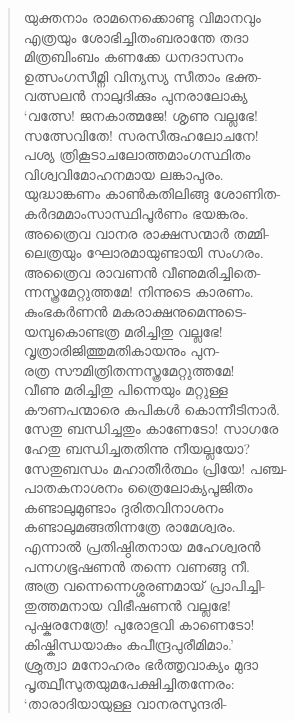 \begin{verse}
യുക്തനാം രാമനെക്കൊണ്ടു വിമാനവും\\
എത്രയും ശോഭിച്ചിതംബരാന്തേ തദാ\\
മിത്രബിംബം കണക്കേ ധനദാസനം\\
ഉത്സംഗസീമ്നി വിന്യസ്യ സീതാം ഭക്ത-\\
വത്സലന്‍ നാലുദിക്കും പുനരാലോക്യ\\
‘വത്സേ! ജനകാത്മജേ! ശൃണു വല്ലഭേ!\\
സത്സേവിതേ! സരസീരുഹലോചനേ!\\
പശ്യ ത്രികൂടാചലോത്തമാംഗസ്ഥിതം\\
വിശ്വവിമോഹനമായ ലങ്കാപുരം.\\
യുദ്ധാങ്കണം കാണ്‍കതിലിങ്ങു ശോണിത-\\
കര്‍ദമമാംസാസ്ഥിപൂര്‍ണം ഭയങ്കരം.\\
അത്രൈവ വാനര രാക്ഷസന്മാര്‍ തമ്മി-\\
ലെത്രയും ഘോരമായുണ്ടായി സംഗരം.\\
അത്രൈവ രാവണന്‍ വീണുമരിച്ചിതെ-\\
ന്നസ്ത്രമേറ്റുത്തമേ! നിന്നുടെ കാരണം.\\
കുംഭകര്‍ണന്‍ മകരാക്ഷനുമെന്നുടെ-\\
യമ്പുകൊണ്ടത്ര മരിച്ചിതു വല്ലഭേ!\\
വൃത്രാരിജിത്തുമതികായനും പുന-\\
രത്ര സൗമിത്രിതന്നസ്ത്രമേറ്റുത്തമേ!\\
വീണു മരിച്ചിതു പിന്നെയും മറ്റുള്ള\\
കൗണപന്മാരെ കപികള്‍ കൊന്നീടിനാര്‍.\\
സേതു ബന്ധിച്ചതും കാണേടോ! സാഗരേ\\
ഹേതു ബന്ധിച്ചതതിന്നു നീയല്ലയോ?\\
സേതുബന്ധം മഹാതീര്‍ത്ഥം പ്രിയേ! പഞ്ച-\\
പാതകനാശനം ത്രൈലോക്യപൂജിതം\\
കണ്ടാലുമുണ്ടാം ദുരിതവിനാശനം\\
കണ്ടാലുമങ്ങതിന്നത്രേ രാമേശ്വരം.\\
എന്നാല്‍ പ്രതിഷ്ഠിതനായ മഹേശ്വരന്‍\\
പന്നഗഭൂഷണന്‍ തന്നെ വണങ്ങു നീ.\\
അത്ര വന്നെന്നെശ്ശരണമായ് പ്രാപിച്ചി-\\
തുത്തമനായ വിഭീഷണന്‍ വല്ലഭേ!\\
പുഷ്കരനേത്രേ! പുരോഭുവി കാണെടോ!\\
കിഷ്കിന്ധയാകും കപീന്ദ്രപുരീമിമാം.’\\
ശ്രുത്വാ മനോഹരം ഭര്‍ത്തൃവാക്യം മുദാ\\
പൃത്ഥ്വീസുതയുമപേക്ഷിച്ചിതന്നേരം:\\
‘താരാദിയായുള്ള വാനരസുന്ദരി-\\

\end{verse}
